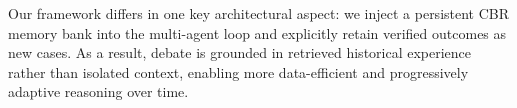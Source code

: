 Our framework differs in one key architectural aspect: we inject a persistent CBR memory bank into the multi-agent loop and explicitly retain verified outcomes as new cases. As a result, debate is grounded in retrieved historical experience rather than isolated context, enabling more data-efficient and progressively adaptive reasoning over time.
